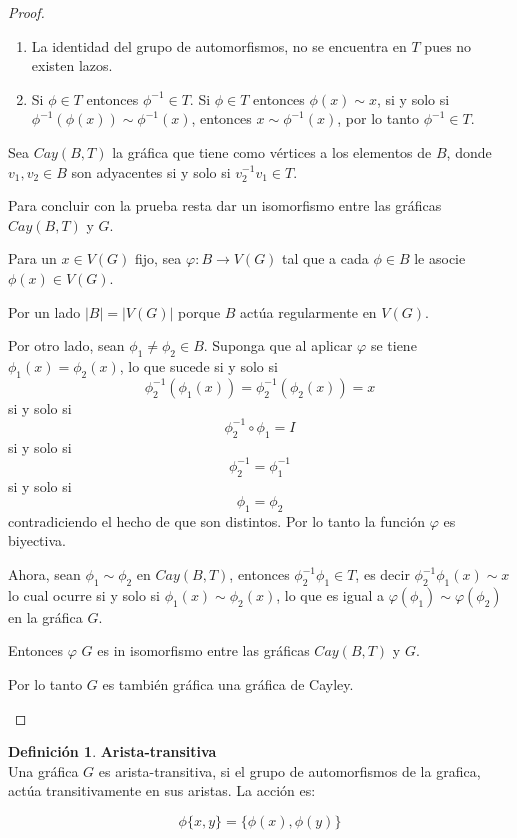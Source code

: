 \documentclass[11pt]{book}
\theoremstyle{definition}
\newtheorem{definition}{Definición}
\begin{document}
\begin{proof}
\begin{enumerate}
\begin{enumerate}
\item La identidad del grupo de automorfismos, no se encuentra en $T$
  pues no existen lazos.
\item Si $\phi \in T$ entonces $\phi^{-1}\in T$.
Si $\phi \in T$ entonces $\phi(x)\sim x$, si y solo si
$\phi^{-1}(\phi (x)) \sim \phi^{-1}(x)$, entonces $x \sim
\phi^{-1}(x)$, por lo tanto $\phi^{-1}\in T$.
\end{enumerate}

Sea $Cay(B,T)$ la gráfica que tiene como vértices a los elementos de
$B$, donde $v_1, v_2 \in B$ son adyacentes si y solo si $v_2^{-1}v_1
\in T$.

Para concluir con la prueba resta dar un isomorfismo entre las gráficas
$Cay(B,T)$ y $G$.

Para un $x\in V(G)$ fijo, sea $\varphi:B \rightarrow V(G)$ tal que a
cada $\phi \in B$ le asocie $\phi (x) \in V(G)$.

Por un lado $|B|=|V(G)|$ porque $B$ actúa regularmente en $V(G)$.

Por otro lado, sean $\phi_{1}\neq \phi_2 \in B$. Suponga que al
aplicar $\varphi$ se tiene $\phi_1(x)=\phi_2(x)$, lo que sucede si
y solo si
$$\phi_2^{-1}(\phi_1(x))=\phi_2^{-1}(\phi_2(x))=x$$
 si y solo si
 $$\phi_2^{-1}\circ \phi_1= I$$ si y solo si
$$\phi_2^{-1}=\phi_1^{-1}$$ si y solo si 
$$\phi_1 =\phi_2$$
contradiciendo el hecho de que son distintos. Por lo tanto la función $\varphi$
es biyectiva.

Ahora, sean $\phi_{1}\sim \phi_2$ en $Cay(B,T)$, entonces
$\phi_2^{-1}\phi_1 \in T$, es decir $\phi_2^{-1}\phi_1(x)\sim
x$ lo cual ocurre si y solo si $\phi_1(x)\sim \phi_2(x)$, lo que es
igual a $\varphi(\phi_1)\sim\varphi(\phi_2)$ en la gráfica
$G$.

Entonces $\varphi$ $G$ es in isomorfismo entre las gráficas
$Cay(B,T)$ y $G$. 

Por lo tanto $G$ es también gráfica una gráfica de Cayley.
\end{enumerate}
\end{proof}


\begin{definition}\textbf{Arista-transitiva}\\
  Una gráfica $G$ es arista-transitiva, si el grupo de automorfismos
  de la grafica, actúa
  transitivamente en sus aristas. La acción es:

  \begin{equation*}\phi\{x,y\}=\{\phi(x),\phi(y)\}\end{equation*}
\end{definition}
\end{document}
